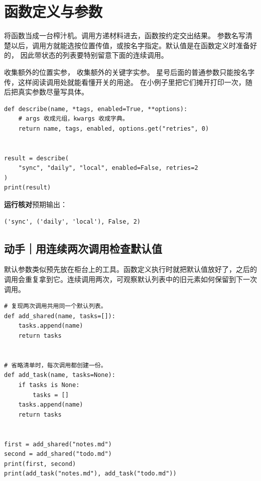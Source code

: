 \documentclass[UTF8,a4paper,oneside,openany,fontset=none,11pt]{ctexbook}
\newcommand{\code}[1]{\texttt{\detokenize{#1}}}
\begin{document}
\section{函数定义与参数}

将函数当成一台榨汁机。调用方递材料进去，函数按约定交出结果。
参数名写清楚以后，调用方就能选按位置传值，或按名字指定。默认值是在函数定义时准备好的，
因此带状态的列表要特别留意下面的连续调用。

\code{*args} 收集额外的位置实参，\code{**kwargs} 收集额外的关键字实参。
星号后面的普通参数只能按名字传，这样阅读调用处就能看懂开关的用途。
在小例子里把它们摊开打印一次，随后把真实参数尽量写具体。


\begin{lstlisting}[title={\code{call_options.py}}]
def describe(name, *tags, enabled=True, **options):
    # args 收成元组，kwargs 收成字典。
    return name, tags, enabled, options.get("retries", 0)


result = describe(
    "sync", "daily", "local", enabled=False, retries=2
)
print(result)
\end{lstlisting}


\textbf{运行核对}\enspace 预期输出：
\begin{lstlisting}[language={},numbers=none]
('sync', ('daily', 'local'), False, 2)
\end{lstlisting}

\par

\subsection*{动手｜用连续两次调用检查默认值}

默认参数类似预先放在柜台上的工具。函数定义执行时就把默认值放好了，之后的调用会重复拿到它。连续调用两次，可观察默认列表中的旧元素如何保留到下一次调用。

\begin{lstlisting}[title={\code{task_defaults.py}}]
# 复现两次调用共用同一个默认列表。
def add_shared(name, tasks=[]):
    tasks.append(name)
    return tasks


# 省略清单时，每次调用都创建一份。
def add_task(name, tasks=None):
    if tasks is None:
        tasks = []
    tasks.append(name)
    return tasks


first = add_shared("notes.md")
second = add_shared("todo.md")
print(first, second)
print(add_task("notes.md"), add_task("todo.md"))
\end{lstlisting}
\end{document}

